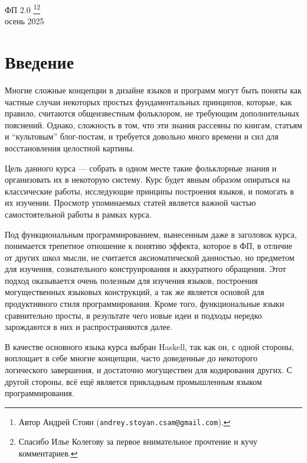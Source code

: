 \documentclass[12pt]{article}
\begin{document}
    \begin{center}
    {\LARGE ФП 2.0}
        \footnote{Автор Андрей Стоян (\texttt{andrey.stoyan.csam@gmail.com}).}\footnote{Спасибо Илье Колегову за первое внимательное прочтение и кучу комментариев.}
        \\
        осень 2025
    \end{center}

    \tableofcontents

    \newpage

    \section*{Введение}

    Многие сложные концепции в дизайне языков и программ могут быть поняты как частные случаи некоторых простых фундаментальных принципов, которые, как правило, считаются общеизвестным фольклором, не требующим дополнительных пояснений.
    Однако, сложность в том, что эти знания рассеяны по книгам, статьям и ``культовым'' блог-постам, и требуется довольно много времени и сил для восстановления целостной картины.

    Цель данного курса --- собрать в одном месте такие фольклорные знания и организовать их в некоторую систему.
    Курс будет явным образом опираться на классические работы, исследующие принципы построения языков, и помогать в их изучении.
    Просмотр упоминаемых статей является важной частью самостоятельной работы в рамках курса.

    Под функциональным программированием, вынесенным даже в заголовок курса, понимается трепетное отношение к понятию эффекта, которое в ФП, в отличие от других школ мысли, не считается аксиоматической данностью, но предметом для изучения, сознательного конструирования и аккуратного обращения.
    Этот подход оказывается очень полезным для изучения языков, построения могущественных языковых конструкций, а так же является основой для продуктивного стиля программирования.
    Кроме того, функциональные языки сравнительно просты, в результате чего новые идеи и подходы нередко зарождаются в них и распространяются далее.

    В качестве основного языка курса выбран Haskell, так как он, с одной стороны, воплощает в себе многие концепции, часто доведенные до некоторого логического завершения, и достаточно могуществен для кодирования других.
    С другой стороны, всё ещё является прикладным промышленным языком программирования.
\end{document}
